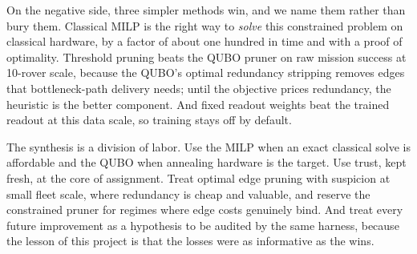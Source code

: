 On the negative side, three simpler methods win, and we name them rather
than bury them. Classical MILP is the right way to \emph{solve} this
constrained problem on classical hardware, by a factor of about one
hundred in time and with a proof of optimality. Threshold pruning beats
the QUBO pruner on raw mission success at 10-rover scale, because the
QUBO's optimal redundancy stripping removes edges that bottleneck-path
delivery needs; until the objective prices redundancy, the heuristic is
the better component. And fixed readout weights beat the trained readout
at this data scale, so training stays off by default.

The synthesis is a division of labor. Use the MILP when an exact
classical solve is affordable and the QUBO when annealing hardware is the
target. Use trust, kept fresh, at the core of assignment. Treat optimal
edge pruning with suspicion at small fleet scale, where redundancy is
cheap and valuable, and reserve the constrained pruner for regimes where
edge costs genuinely bind. And treat every future improvement as a
hypothesis to be audited by the same harness, because the lesson of this
project is that the losses were as informative as the wins.
